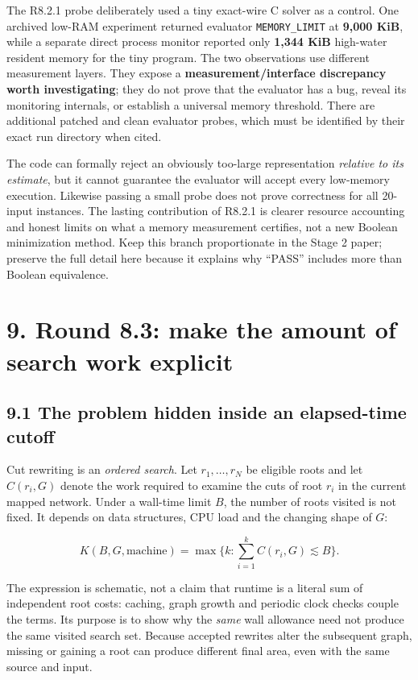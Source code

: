 The R8.2.1 probe deliberately used a tiny exact-wire C solver as a control. One archived low-RAM experiment returned evaluator \texttt{MEMORY\_LIMIT} at \textbf{9,000 KiB}, while a separate direct process monitor reported only \textbf{1,344 KiB} high-water resident memory for the tiny program. The two observations use different measurement layers. They expose a \textbf{measurement/interface discrepancy worth investigating}; they do not prove that the evaluator has a bug, reveal its monitoring internals, or establish a universal memory threshold. There are additional patched and clean evaluator probes, which must be identified by their exact run directory when cited.

The code can formally reject an obviously too-large representation \emph{relative to its estimate}, but it cannot guarantee the evaluator will accept every low-memory execution. Likewise passing a small probe does not prove correctness for all 20-input instances. The lasting contribution of R8.2.1 is clearer resource accounting and honest limits on what a memory measurement certifies, not a new Boolean minimization method. Keep this branch proportionate in the Stage 2 paper; preserve the full detail here because it explains why ``PASS'' includes more than Boolean equivalence.

\section{9. Round 8.3: make the amount of search work explicit}\label{round-8.3-make-the-amount-of-search-work-explicit}

\subsection{9.1 The problem hidden inside an elapsed-time cutoff}\label{the-problem-hidden-inside-an-elapsed-time-cutoff}

Cut rewriting is an \emph{ordered search}. Let \(r_1,\ldots,r_N\) be eligible roots and let \(C(r_i,G)\) denote the work required to examine the cuts of root \(r_i\) in the current mapped network. Under a wall-time limit \(B\), the number of roots visited is not fixed. It depends on data structures, CPU load and the changing shape of \(G\):

\[
K(B,G,\mathrm{machine})=
\max\biggl\{k:\sum_{i=1}^{k}C(r_i,G)\lesssim B\biggr\}.
\]

The expression is schematic, not a claim that runtime is a literal sum of independent root costs: caching, graph growth and periodic clock checks couple the terms. Its purpose is to show why the \emph{same} wall allowance need not produce the same visited search set. Because accepted rewrites alter the subsequent graph, missing or gaining a root can produce different final area, even with the same source and input.

